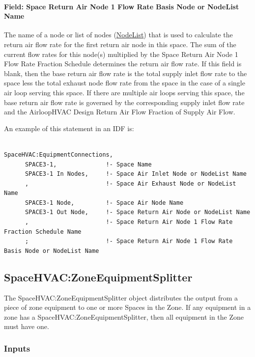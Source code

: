 \paragraph{Field: Space Return Air Node 1 Flow Rate Basis Node or NodeList Name}\label{field-space-return-air-flow-rate-basis-node-or-nodelist-name}

The name of a node or list of nodes (\hyperref[nodelist]{NodeList}) that is used to calculate the return air flow rate for the first return air node in this space. The sum of the current flow rates for this node(s) multiplied by the Space Return Air Node 1 Flow Rate Fraction Schedule determines the return air flow rate. If this field is blank, then the base return air flow rate is the total supply inlet flow rate to the space less the total exhaust node flow rate from the space in the case of a single air loop serving this space. If there are multiple air loops serving this space, the base return air flow rate is governed by the corresponding supply inlet flow rate and the AirloopHVAC Design Return Air Flow Fraction of Supply Air Flow.

An example of this statement in an IDF is:

\begin{lstlisting}

SpaceHVAC:EquipmentConnections,
      SPACE3-1,              !- Space Name
      SPACE3-1 In Nodes,     !- Space Air Inlet Node or NodeList Name
      ,                      !- Space Air Exhaust Node or NodeList Name
      SPACE3-1 Node,         !- Space Air Node Name
      SPACE3-1 Out Node,     !- Space Return Air Node or NodeList Name
      ,                      !- Space Return Air Node 1 Flow Rate Fraction Schedule Name
      ;                      !- Space Return Air Node 1 Flow Rate Basis Node or NodeList Name
\end{lstlisting}

\subsection{SpaceHVAC:ZoneEquipmentSplitter}\label{spacehvaczoneequipmentsplitter}

The SpaceHVAC:ZoneEquipmentSplitter object distributes the output from a piece of zone equipment to one or more Spaces in the Zone.
If any equipment in a zone has a SpaceHVAC:ZoneEquipmentSplitter, then all equipment in the Zone must have one.

\subsubsection{Inputs}\label{inputs-1-052-seqsplitter}

